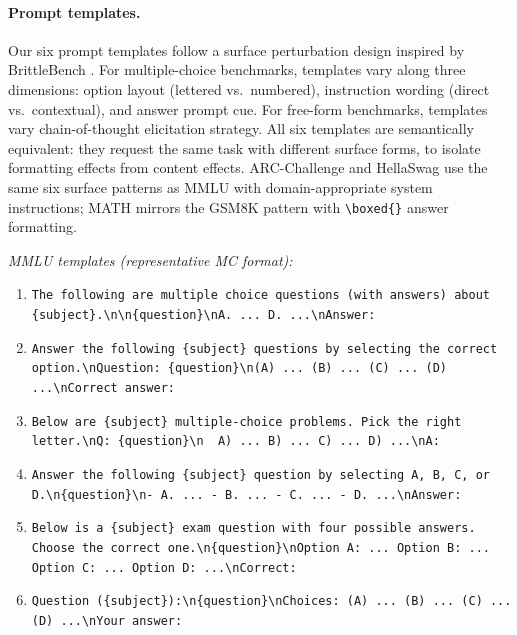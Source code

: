 \paragraph{Prompt templates.} Our six prompt templates follow a surface perturbation design inspired by BrittleBench \cite{brittlebench2026}. For multiple-choice benchmarks, templates vary along three dimensions: option layout (lettered vs.\ numbered), instruction wording (direct vs.\ contextual), and answer prompt cue. For free-form benchmarks, templates vary chain-of-thought elicitation strategy. All six templates are semantically equivalent: they request the same task with different surface forms, to isolate formatting effects from content effects. ARC-Challenge and HellaSwag use the same six surface patterns as MMLU with domain-appropriate system instructions; MATH mirrors the GSM8K pattern with \texttt{\textbackslash boxed\{\}} answer formatting.

\smallskip\noindent\textit{MMLU templates (representative MC format):}
\begin{enumerate}\setlength{\itemsep}{0pt}\setlength{\parsep}{0pt}\setlength{\topsep}{0pt}
\item \texttt{The following are multiple choice questions (with answers) about \{subject\}.\textbackslash n\textbackslash n\{question\}\textbackslash nA. ... D. ...\textbackslash nAnswer:}
\item \texttt{Answer the following \{subject\} questions by selecting the correct option.\textbackslash nQuestion: \{question\}\textbackslash n(A) ... (B) ... (C) ... (D) ...\textbackslash nCorrect answer:}
\item \texttt{Below are \{subject\} multiple-choice problems. Pick the right letter.\textbackslash nQ: \{question\}\textbackslash n~~A) ... B) ... C) ... D) ...\textbackslash nA:}
\item \texttt{Answer the following \{subject\} question by selecting A, B, C, or D.\textbackslash n\{question\}\textbackslash n- A. ... - B. ... - C. ... - D. ...\textbackslash nAnswer:}
\item \texttt{Below is a \{subject\} exam question with four possible answers. Choose the correct one.\textbackslash n\{question\}\textbackslash nOption A: ... Option B: ... Option C: ... Option D: ...\textbackslash nCorrect:}
\item \texttt{Question (\{subject\}):\textbackslash n\{question\}\textbackslash nChoices: (A) ... (B) ... (C) ... (D) ...\textbackslash nYour answer:}
\end{enumerate}

